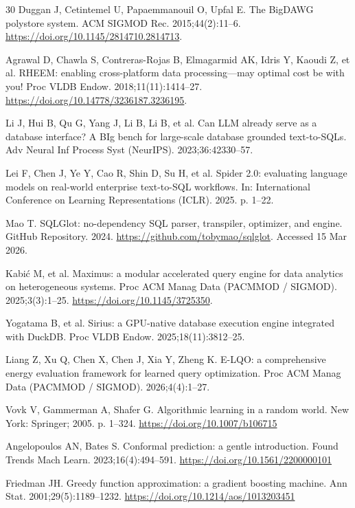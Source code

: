 \documentclass[10pt,a4paper]{article}
\begin{document}
{\begin{thebibliography}{30}
Duggan J, Cetintemel U, Papaemmanouil O, Upfal E. The BigDAWG polystore system. ACM SIGMOD Rec. 2015;44(2):11--6. \url{https://doi.org/10.1145/2814710.2814713}.

Agrawal D, Chawla S, Contreras-Rojas B, Elmagarmid AK, Idris Y, Kaoudi Z, et al. RHEEM: enabling cross-platform data processing---may optimal cost be with you! Proc VLDB Endow. 2018;11(11):1414--27. \url{https://doi.org/10.14778/3236187.3236195}.

Li J, Hui B, Qu G, Yang J, Li B, Li B, et al. Can LLM already serve as a database interface? A BIg bench for large-scale database grounded text-to-SQLs. Adv Neural Inf Process Syst (NeurIPS). 2023;36:42330--57.

Lei F, Chen J, Ye Y, Cao R, Shin D, Su H, et al. Spider 2.0: evaluating language models on real-world enterprise text-to-SQL workflows. In: International Conference on Learning Representations (ICLR). 2025. p. 1--22.

Mao T. SQLGlot: no-dependency SQL parser, transpiler, optimizer, and engine. GitHub Repository. 2024. \url{https://github.com/tobymao/sqlglot}. Accessed 15 Mar 2026.

 Kabi\'{c} M, et al. Maximus: a modular accelerated query engine for data analytics on heterogeneous systems. Proc ACM Manag Data (PACMMOD / SIGMOD). 2025;3(3):1--25. \url{https://doi.org/10.1145/3725350}.

 Yogatama B, et al. Sirius: a GPU-native database execution engine integrated with DuckDB. Proc VLDB Endow. 2025;18(11):3812--25.

 Liang Z, Xu Q, Chen X, Chen J, Xia Y, Zheng K. E-LQO: a comprehensive energy evaluation framework for learned query optimization. Proc ACM Manag Data (PACMMOD / SIGMOD). 2026;4(4):1--27.

Vovk V, Gammerman A, Shafer G. Algorithmic learning in a random world. New York: Springer; 2005. p. 1--324. \url{https://doi.org/10.1007/b106715}

Angelopoulos AN, Bates S. Conformal prediction: a gentle introduction. Found Trends Mach Learn. 2023;16(4):494--591. \url{https://doi.org/10.1561/2200000101}

Friedman JH. Greedy function approximation: a gradient boosting machine. Ann Stat. 2001;29(5):1189--1232. \url{https://doi.org/10.1214/aos/1013203451}


\end{thebibliography}}
\end{document}
